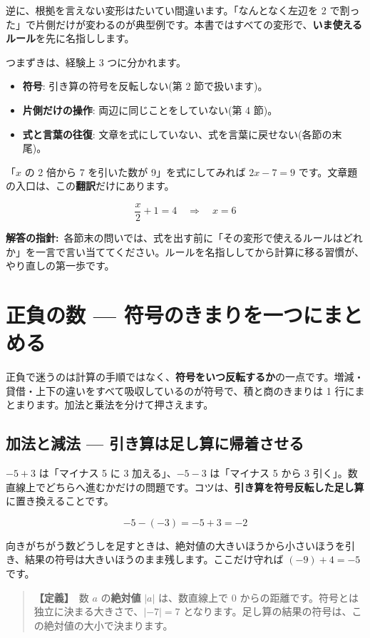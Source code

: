 \documentclass{article}
\begin{document}
逆に、根拠を言えない変形はたいてい間違います。「なんとなく左辺を 2 で割った」で片側だけが変わるのが典型例です。本書ではすべての変形で、\textbf{いま使えるルール}を先に名指しします。

つまずきは、経験上 3 つに分かれます。

\begin{itemize}
\item \textbf{符号}: 引き算の符号を反転しない(第 2 節で扱います)。
\item \textbf{片側だけの操作}: 両辺に同じことをしていない(第 4 節)。
\item \textbf{式と言葉の往復}: 文章を式にしていない、式を言葉に戻せない(各節の末尾)。
\end{itemize}

「\(x\) の 2 倍から 7 を引いた数が 9」を式にしてみれば \(2x - 7 = 9\) です。文章題の入口は、この\textbf{翻訳}だけにあります。

\[ \frac{x}{2} + 1 = 4 \quad \Rightarrow \quad x = 6 \]

\textbf{解答の指針:}\ 各節末の問いでは、式を出す前に「その変形で使えるルールはどれか」を一言で言い当ててください。ルールを名指ししてから計算に移る習慣が、やり直しの第一歩です。

\section{正負の数 — 符号のきまりを一つにまとめる}

正負で迷うのは計算の手順ではなく、\textbf{符号をいつ反転するか}の一点です。増減・貸借・上下の違いをすべて吸収しているのが符号で、積と商のきまりは 1 行にまとまります。加法と乗法を分けて押さえます。

\subsection{加法と減法 — 引き算は足し算に帰着させる}

\(-5 + 3\) は「マイナス 5 に 3 加える」、\(-5 - 3\) は「マイナス 5 から 3 引く」。数直線上でどちらへ進むかだけの問題です。コツは、\textbf{引き算を符号反転した足し算}に置き換えることです。

\[ -5 - (-3) = -5 + 3 = -2 \]

向きがちがう数どうしを足すときは、絶対値の大きいほうから小さいほうを引き、結果の符号は大きいほうのまま残します。ここだけ守れば \((-9) + 4 = -5\) です。

\begin{quote}
\textbf{【定義】}\ 数 \(a\) の\textbf{絶対値} \(|a|\) は、数直線上で 0 からの距離です。符号とは独立に決まる大きさで、\(|-7| = 7\) となります。足し算の結果の符号は、この絶対値の大小で決まります。
\end{quote}
\end{document}
